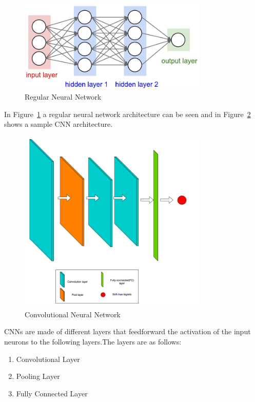 \begin{figure}[t]
\centering
\includegraphics[width=0.8\textwidth]{Figures/regnn}
\caption{Regular Neural Network}
\label{figregnn}
\end{figure}

In Figure~\ref{figregnn} a regular neural network architecture can be seen and in Figure~\ref{figconvnet} shows a sample CNN architecture. 

\begin{figure}[t]
\centering
\includegraphics[width=0.8\textwidth]{Figures/convnet}
\caption{Convolutional Neural Network}
\label{figconvnet}
\end{figure}

CNNs are made of different layers that feedforward the activation of the input neurons to the following layers.The layers are as follows:

\begin{enumerate}
    \item Convolutional Layer
    \item Pooling Layer
    \item Fully Connected Layer
\end{enumerate}

